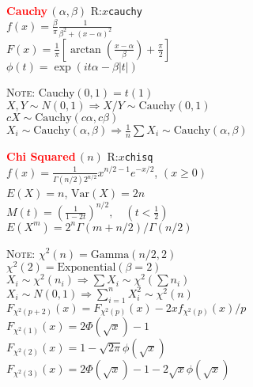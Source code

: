 \documentclass[10pt]{article}
\newenvironment{LIST}[1]{\begin{list}{}
                          { \settowidth{\labelwidth}{#1}
                            \setlength{\leftmargin}{\labelwidth}
                            \addtolength{\leftmargin}{\labelsep}
                            \setlength{\parsep}{0.5ex plus0.2ex minus0.2ex}
                            \setlength{\itemsep}{0ex plus0.2ex}
                            \renewcommand{\makelabel}[1]{##1\hfill}
                          }
                        }
                        {\end{list}}
\begin{document}
\begin{multicols}{2}
\begin{small}
\begin{enumerate}
\item \textcolor{red}{\bfseries\textsf{Cauchy}}\,$(\alpha,\beta)$ \hfill \textsf{R:}$x$\texttt{\color{red}cauchy} \\
      $f(x) = \displaystyle\frac{\beta}{\pi} \frac{1}{\beta^2+(x-\alpha)^2}$\\
      $F(x) = \displaystyle\frac{1}{\pi}\left[\arctan\left(\frac{x-\alpha}{\beta}\right)
              + \frac{\pi}{2} \right]$ \\
      $\phi(t) = \exp(it\alpha-\beta|t|)$
      \begin{LIST}{\textsc{Note:}}
      \item[\textsc{Note:}] Cauchy$(0,1) = t(1)$\\
              $X,Y \sim N(0,1) \Rightarrow X/Y \sim \textrm{Cauchy}(0,1)$\\
              $cX \sim  \textrm{Cauchy}(c\alpha,c\beta)$\\
              $X_i \sim \textrm{Cauchy}(\alpha,\beta) \Rightarrow 
                \frac{1}{n}\sum X_i \sim \textrm{Cauchy}(\alpha,\beta)$ 
      \end{LIST}
\item \textcolor{red}{\bfseries\textsf{Chi Squared}}\,$(n)$ \hfill \textsf{R:}$x$\texttt{\color{red}chisq}  \\
      $f(x) = \displaystyle\frac{1}{\Gamma(n/2) 2^{n/2}} x^{n/2-1} e^{-x/2}$, $(x \ge 0)$\\
      $E(X)=n$, $\textrm{Var}(X)=2n$\\
      $M(t) = \left(\frac{1}{1-2t}\right)^{n/2},\quad (t < \frac{1}{2})$\\
      $E(X^m)=2^n \Gamma(m+n/2)/\Gamma(n/2)$ 
      \begin{LIST}{\textsc{Note:}}
      \item[\textsc{Note:}] 
           $\chi^2(n)=\textrm{Gamma}(n/2,2)$ \\
           $\chi^2(2)=\textrm{Exponential}(\beta=2)$ \\
           $X_i \sim \chi^2(n_i) \Rightarrow \sum X_i \sim \chi^2(\sum n_i)$ \\
           $X_i \sim N(0,1) \Rightarrow \sum_{i=1}^{n}X_i^2 \sim \chi^2(n)$\\
           $F_{\chi^2(p+2)}(x)=F_{\chi^2(p)}(x)-2xf_{\chi^2(p)}(x)/p$\\
           $F_{\chi^2(1)}(x)=2\Phi(\sqrt{x})-1$\\
           $F_{\chi^2(2)}(x)=1-\sqrt{2\pi}\phi(\sqrt{x})$\\
           $F_{\chi^2(3)}(x)=2\Phi(\sqrt{x})-1-2\sqrt{x}\phi(\sqrt{x})$
      \end{LIST}


\end{enumerate}
\end{small}
\end{multicols}
\end{document}
